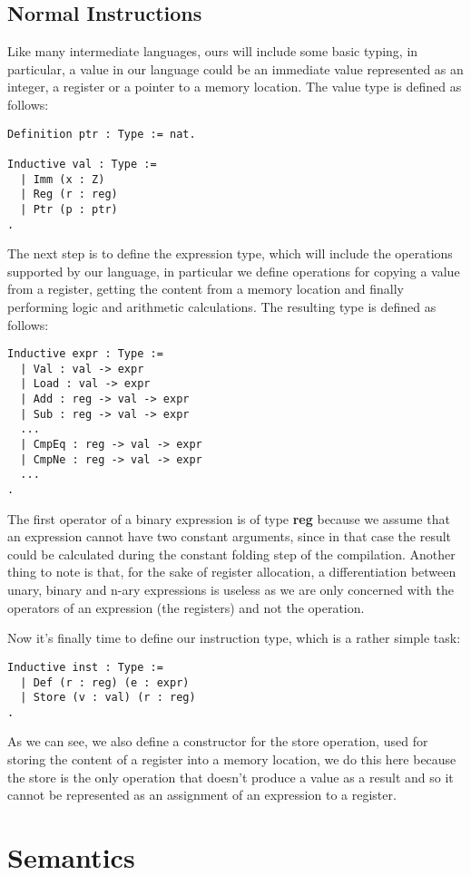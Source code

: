 \subsection{Normal Instructions}

Like many intermediate languages, ours will include some basic typing, in particular, a value in our language could be an immediate value represented as an integer, a register or a pointer to a memory location. The value type is defined as follows:

\begin{lstlisting}[language=Coq]
Definition ptr : Type := nat.

Inductive val : Type :=
  | Imm (x : Z)
  | Reg (r : reg)
  | Ptr (p : ptr)
.
\end{lstlisting}

The next step is to define the expression type, which will include the operations supported by our language, in particular we define operations for copying a value from a register, getting the content from a memory location and finally performing logic and arithmetic calculations. The resulting type is defined as follows:

\begin{lstlisting}[language=Coq]
Inductive expr : Type :=
  | Val : val -> expr
  | Load : val -> expr
  | Add : reg -> val -> expr
  | Sub : reg -> val -> expr
  ...
  | CmpEq : reg -> val -> expr
  | CmpNe : reg -> val -> expr
  ...
.
\end{lstlisting}

The first operator of a binary expression is of type \textbf{reg} because we assume that an expression cannot have two constant arguments, since in that case the result could be calculated during the constant folding step of the compilation.
Another thing to note is that, for the sake of register allocation, a differentiation between unary, binary and n-ary expressions is useless as we are only concerned with the operators of an expression (the registers) and not the operation.

Now it's finally time to define our instruction type, which is a rather simple task:

\begin{lstlisting}[language=Coq]
  Inductive inst : Type :=
  | Def (r : reg) (e : expr)
  | Store (v : val) (r : reg)
.
\end{lstlisting}

As we can see, we also define a constructor for the store operation, used for storing the content of a register into a memory location, we do this here because the store is the only operation that doesn't produce a value as a result and so it cannot be represented as an assignment of an expression to a register.

\section{Semantics}


